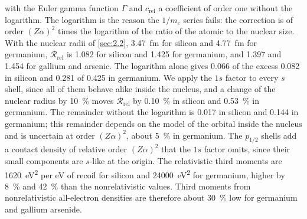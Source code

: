 with the Euler gamma function $\Gamma$ and $c_{\mathrm{rel}}$ a coefficient of order one without the logarithm. The logarithm is the reason the $1/m_e$ series fails: the correction is of order $(Z\alpha)^2$ times the logarithm of the ratio of the atomic to the nuclear size. With the nuclear radii of \cref{sec:2.2}, \SI{3.47}{fm} for silicon and \SI{4.77}{fm} for germanium, $\mathcal{R}_{\mathrm{rel}}$ is 1.082 for silicon and 1.425 for germanium, and 1.397 and 1.454 for gallium and arsenic. The logarithm alone gives 0.066 of the excess 0.082 in silicon and 0.281 of 0.425 in germanium. We apply the $1s$ factor to every $s$ shell, since all of them behave alike inside the nucleus, and a change of the nuclear radius by \SI{10}{\percent} moves $\mathcal{R}_{\mathrm{rel}}$ by \SI{0.10}{\percent} in silicon and \SI{0.53}{\percent} in germanium. The remainder without the logarithm is 0.017 in silicon and 0.144 in germanium; this remainder depends on the model of the orbital inside the nucleus and is uncertain at order $(Z\alpha)^2$, about \SI{5}{\percent} in germanium. The $p_{1/2}$ shells add a contact density of relative order $(Z\alpha)^2$ that the $1s$ factor omits, since their small components are $s$-like at the origin. The relativistic third moments are \SI{1620}{eV^2} per eV of recoil for silicon and \SI{24000}{eV^2} for germanium, higher by \SI{8}{\percent} and \SI{42}{\percent} than the nonrelativistic values. Third moments from nonrelativistic all-electron densities are therefore about \SI{30}{\percent} low for germanium and gallium arsenide.


